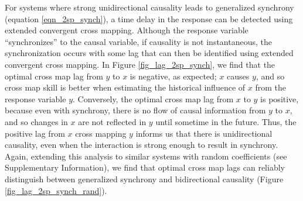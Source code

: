 For systems where strong unidirectional causality leads to generalized synchrony (equation \ref{eqn_2sp_synch}), a time delay in the response can be detected using extended convergent cross mapping. Although the response variable ``synchronizes'' to the causal variable, if causality is not instantaneous, the synchronization occurs with some lag that can then be identified using extended convergent cross mapping. In Figure \ref{fig_lag_2sp_synch}, we find that the optimal cross map lag from $y$ to $x$ is negative, as expected; $x$ causes $y$, and so cross map skill is better when estimating the historical influence of $x$ from the response variable $y$. Conversely, the optimal cross map lag from $x$ to $y$ is positive, because even with synchrony, there is no flow of causal information from $y$ to $x$, and so changes in $x$ are not reflected in $y$ until sometime in the future. Thus, the positive lag from $x$ cross mapping $y$ informs us that there is unidirectional causality, even when the interaction is strong enough to result in synchrony. Again, extending this analysis to similar systems with random coefficients (see Supplementary Information), we find that optimal cross map lags can reliably distinguish between generalized synchrony and bidirectional causality (Figure \ref{fig_lag_2sp_synch_rand}).

